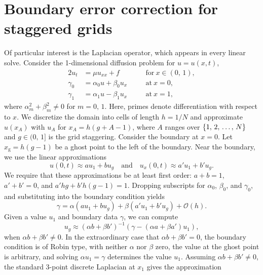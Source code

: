 \appendix
\section{Boundary error correction for staggered grids}\label{sec:boundary-correction}

Of particular interest is the Laplacian operator, which appears in every linear
solve. Consider the 1-dimensional diffusion problem for $u = u(x, t)$,
\begin{alignat}{2}
    u_t      &= \mu u_{xx} + f           &&\quad \text{for} \ x\in(0,\,1), \label{eq:1d-diff} \\
    \gamma_0 &= \alpha_0 u + \beta_0 u_x &&\quad \text{at} \ x=0, \label{eq:1d-0bcs} \\
    \gamma_1 &= \alpha_1 u - \beta_1 u_x &&\quad \text{at} \ x=1, \label{eq:1d-1bcs}
\end{alignat}
where $\alpha_m^2 + \beta_m^2 \neq 0$ for $m = 0,\,1$. Here, primes denote
differentiation with respect to $x$. We discretize the domain into cells of length
$h=1/N$ and approximate $u(x_A)$ with $u_A$ for $x_A = h(g + A-1)$, where $A$ ranges over
$\{1,\,2,\,\ldots,\,N\}$ and $g\in(0,\,1]$ is the grid staggering. Consider the boundary at $x=0$. Let
$x_\text{g} = h(g-1)$ be a ghost point to the left of the boundary. Near the boundary, we
use the linear approximations
\begin{equation}
    u(0, t) \approx au_1 + bu_g \quad \text{and} \quad u_x(0, t) \approx a'u_1 + b'u_g.
    \label{eq:1d-approx}
\end{equation}
We require that these approximations be at least first order: $a+b=1$, $a'+b'=0$, and
$a'hg + b'h(g-1) = 1$. Dropping subscripts for $\alpha_0$, $\beta_0$, and $\gamma_0$,
and substituting into the boundary condition yields
\begin{equation}
    \gamma = \alpha(au_1 + bu_g) + \beta(a'u_1 + b'u_g) + \mathcal{O}(h).
    \label{eq:1d-bc}
\end{equation}
Given a value $u_1$ and boundary data $\gamma$, we can compute
\begin{equation}
    u_g \approx (\alpha b + \beta b')^{-1}(\gamma-(\alpha a + \beta a')u_1),
\end{equation}
when $\alpha b + \beta b' \neq 0$. In the extraordinary case that
$\alpha b + \beta b' = 0$, the boundary condition is of Robin type, with neither
$\alpha$ nor $\beta$ zero, the value at the ghost point is arbitrary, and solving
$\alpha u_1 = \gamma$ determines the value $u_1$. Assuming $\alpha b + \beta b' \neq 0$,
the standard 3-point discrete Laplacian at $x_1$ gives the approximation
